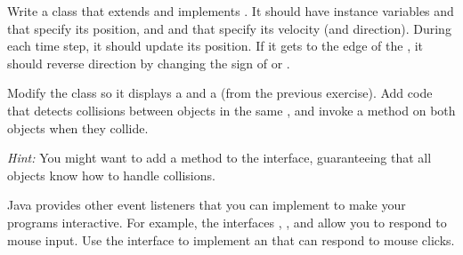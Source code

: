 \begin{exercise}

Write a class  that extends  and implements .
It should have instance variables  and  that specify its position, and  and  that specify its velocity (and direction).
During each time step, it should update its position.
If it gets to the edge of the , it should reverse direction by changing the sign of  or .

\end{exercise}


\begin{exercise}

Modify the  class so it displays a  and a  (from the previous exercise).
Add code that detects collisions between  objects in the same , and invoke a method on both objects when they collide.

{\em Hint:} You might want to add a method to the  interface, guaranteeing that all  objects know how to handle collisions.

\end{exercise}


\begin{exercise}

Java provides other event listeners that you can implement to make your programs interactive.
For example, the interfaces , , and  allow you to respond to mouse input.
Use the  interface to implement an  that can respond to mouse clicks.

\end{exercise}
